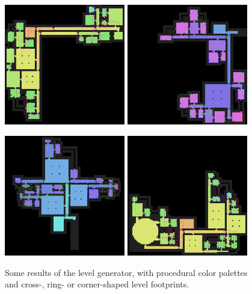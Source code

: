 \documentclass[11pt,a4paper, twocolumn]{article}
\begin{document}
\begin{figure}
    \center
    \includegraphics[width=0.47\textwidth]{level1.png}
    \hfill
    \includegraphics[width=0.47\textwidth]{level2.png}

    \vspace{0.5cm}

    \includegraphics[width=0.47\textwidth]{level4.png}
    \hfill
    \includegraphics[width=0.47\textwidth]{level3.png}

    \caption{Some results of the level generator, with procedural color palettes and cross-, ring- or corner-shaped
            level footprints.}
\end{figure}
\end{document}
